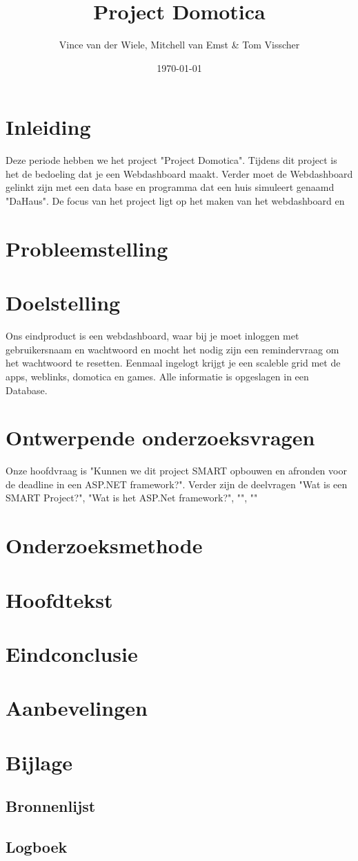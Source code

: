 \documentclass[11pt, letterpaper]{article}
\title{Project Domotica}
\author{Vince van der Wiele, Mitchell van Emst & Tom Visscher}
\date{\today}
\begin{document}
\begin{titlepage}
\maketitle
\end{titlepage}

\tableofcontents

\newpage

\section{Inleiding}
Deze periode hebben we het project "Project Domotica". Tijdens dit project is het de bedoeling dat je een Webdashboard maakt. Verder moet de Webdashboard gelinkt zijn met een data base en programma dat een huis simuleert genaamd "DaHaus". De focus van het project ligt op het maken van het webdashboard en 

\section{Probleemstelling}


\section{Doelstelling}
Ons eindproduct is een webdashboard, waar bij je moet inloggen met gebruikersnaam en wachtwoord en mocht het nodig zijn een remindervraag om het wachtwoord te resetten. Eenmaal ingelogt krijgt je een scaleble grid met de apps, weblinks, domotica en games. Alle informatie is opgeslagen in een Database.

\section{Ontwerpende onderzoeksvragen}
Onze hoofdvraag is "Kunnen we dit project SMART opbouwen en afronden voor de deadline in een ASP.NET framework?". Verder zijn de deelvragen "Wat is een SMART Project?", "Wat is het ASP.Net framework?", "", ""

\section{Onderzoeksmethode}


\section{Hoofdtekst}


\section{Eindconclusie}


\section{Aanbevelingen}


\section{Bijlage}
	\subsection{Bronnenlijst}
	
	
	\subsection{Logboek}
	
\end{document}
